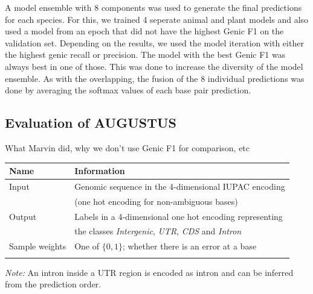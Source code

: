 \documentclass{bioinfo}
\begin{document}
\begin{methods}
A model ensemble with 8 components was used to generate the final predictions for each species. For this, we trained 4 seperate animal and plant models and also used a model from an epoch that did not have the highest Genic F1 on the validation set. Depending on the results, we used the model iteration with either the highest genic recall or precision. The model with the best Genic F1 was always best in one of those. This was done to increase the diversity of the model ensemble. As with the overlapping, the fusion of the 8 individual predictions was done by averaging the softmax values of each base pair prediction.

\subsection{Evaluation of AUGUSTUS} 
\label{sec:augustus}
What Marvin did, why we don't use Genic F1 for comparison, etc


\begin{table}[!t]
 {
\begin{tabular}{@{}ll@{}}
\toprule Name & Information \\
\midrule
Input & Genomic sequence in the 4-dimensional IUPAC encoding\\
	  & (one hot encoding for non-ambiguous bases) \\
Output & Labels in a 4-dimensional one hot encoding representing \\
      & the classes {\it Intergenic}, {\it UTR}, {\it CDS} and {\it Intron}\\
Sample weights & One of $\{0,1\}$; whether there is an error at a base\\
\botrule
\end{tabular}}{{\it Note:} An intron inside a UTR region is encoded as intron and can be inferred from the prediction order.}
\end{table}

\end{methods}
\end{document}
